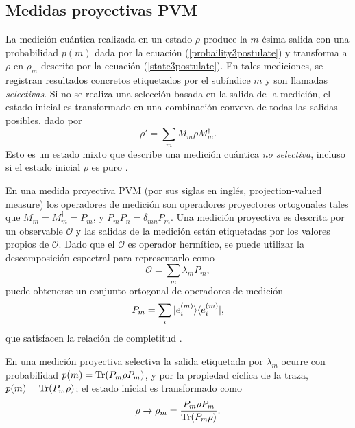 \subsection{Medidas proyectivas PVM}\label{subsec:medidasproyectivasPVM} %
La medición cuántica realizada en un estado $\rho$ produce  la $m$-ésima 
salida con una probabilidad $p(m)$ dada por la ecuación
(\ref{probaility3postulate}) y transforma a $\rho $ en $\rho_m$ descrito por la
ecuación (\ref{state3postulate}). En tales mediciones, se registran resultados
concretos etiquetados por el subíndice $m$ y son llamadas \textit{selectivas}.
Si no se realiza una selección basada en la salida de la medición, el estado
inicial es transformado en una combinación convexa de todas las salidas
posibles, dado por 
\begin{equation}\label{non-selective-measure}
	\rho'=\sum_m M_m\rho M_m^\dagger.
\end{equation}
Esto es un estado mixto que  describe una medición cuántica \textit{no selectiva}, incluso si el estado inicial $\rho$ es puro {\cite{2007geometry}}.

En una medida proyectiva PVM (por sus siglas en inglés, projection-valued
measure) los operadores de medición son operadores proyectores ortogonales
tales que $M_{m}=M_{m}^{\dagger}=P_{m}$, y $P_{m}P_{n}=\delta_{mn}P_{m}$. Una
medición proyectiva es descrita por un observable $\mathcal{O}$ y las salidas
de la medición están etiquetadas por los valores propios de $\mathcal{O}$. Dado
que el $\mathcal{O}$ es operador hermítico, se puede utilizar la descomposición
espectral para representarlo como \begin{equation}
	\mathcal{O}=\sum_m \lambda_m P_m,
\end{equation} puede obtenerse un conjunto ortogonal de operadores de medición \[P_m=\sum_i
|e_i^{(m)}\rangle \langle e_i^{(m)}|,\] que satisfacen la relación de completitud
{\cite{2007geometry}}. 

En una medición proyectiva selectiva la salida etiquetada por $\lambda_m$
ocurre con probabilidad $p(m)={\rm Tr}(P_m\rho P_m)$, y por la propiedad cíclica de
la traza,  $p(m)={\rm Tr}(P_m\rho)$; el estado inicial es transformado como 
\begin{equation}\label{stateProjective}
	\rho\to	\rho_m=\dfrac{P_m\rho P_m}{{\rm Tr}(P_m \rho)}.
\end{equation}

